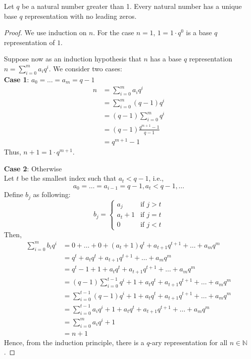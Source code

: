 \documentclass[../main.tex]{subfiles}
\begin{document}
\begin{thm}\label{thm:uniquerep}
    Let $q$ be a natural number greater than 1.
    Every natural number has a unique base $q$ representation with no leading zeros.
\end{thm}
\begin{proof}
    We use induction on $n$.
    For the case $n = 1$, $1 = 1 \cdot q^0$ is a base $q$ representation of $1$.

    Suppose now as an induction hypothesis that $n$ has a base $q$ representation $n = \sum_{i = 0}^m a_i q^i$.
    We consider two cases:\\
    \noindent \textbf{Case 1}: $a_0 = \dots = a_m = q - 1$\\
    \begin{align*}
        n &= \sum_{i = 0}^m a_i q^i\\
          &= \sum_{i = 0}^m (q - 1) q^i\\
          &= (q - 1) \sum_{i = 0}^m q^i\\
          &= (q - 1) \frac{q^{m+1} - 1}{q - 1}\\
          &= q^{m + 1} - 1
    \end{align*}
    Thus, $n + 1 = 1 \cdot q^{m + 1}$.

    \noindent \textbf{Case 2}: Otherwise\\
    \indent Let $t$ be the smallest index such that $a_t < q - 1$, i.e.,
    \[
        a_0 = \dots = a_{i - 1} = q - 1, a_t < q - 1, \dots
    \]
    Define $b_j$ as following:
    \[
        b_j = \begin{cases}
            a_j &\text{if } j > t\\
            a_t + 1 &\text{if } j = t\\
            0 &\text{if } j < t
        \end{cases}
    \]
    Then,
    \begin{align*}
        \sum_{i = 0}^m b_i q^i &= 0 + \dots + 0 + (a_t + 1) q^t + a_{t + 1} q^{t + 1} + \dots + a_m q^m\\
                               &= q^t + a_t q^t + a_{t+1} q^{t+1} + \dots + a_m q^m\\
                               &= q^t - 1 + 1 + a_t q^t + a_{t+1} q^{t+1} + \dots + a_m q^m\\
                               &= (q - 1) \sum_{i = 0}^{t - 1} q^i + 1 + a_t q^t + a_{t+1} q^{t+1} + \dots + a_m q^m\\
                               &= \sum_{i = 0}^{t - 1} (q - 1) q^i + 1 + a_t q^t + a_{t+1} q^{t+1} + \dots + a_m q^m\\
                               &= \sum_{i = 0}^{t - 1} a_i q^i + 1 + a_t q^t + a_{t+1} q^{t+1} + \dots + a_m q^m\\
                               &= \sum_{i = 0}^{m} a_i q^i + 1\\
                               &= n + 1
    \end{align*}
    Hence, from the induction principle, there is a $q$-ary representation for all $n \in \mathbb N$.


\end{proof}
\end{document}
